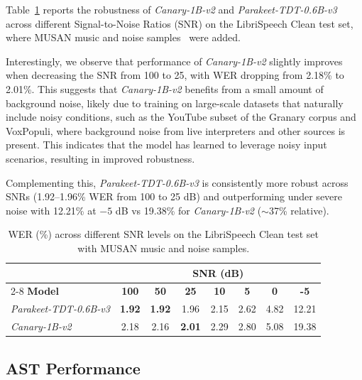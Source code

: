 Table~\ref{tab:noise-robustness} reports the robustness of \emph{Canary-1B-v2} and \emph{Parakeet-TDT-0.6B-v3} across different Signal-to-Noise Ratios (SNR) on the LibriSpeech Clean test set\cite{librispeech}, where MUSAN music and noise samples~\cite{snyder2015musanmusicspeechnoise} were added.

Interestingly, we observe that performance of \emph{Canary-1B-v2} slightly improves when decreasing the SNR from 100 to 25, with WER dropping from 2.18\% to 2.01\%. This suggests that \emph{Canary-1B-v2} benefits from a small amount of background noise, likely due to training on large-scale datasets that naturally include noisy conditions, such as the YouTube subset of the Granary corpus and VoxPopuli, where background noise from live interpreters and other sources is present. This indicates that the model has learned to leverage noisy input scenarios, resulting in improved robustness.  

Complementing this, \emph{Parakeet-TDT-0.6B-v3} is consistently more robust across SNRs (1.92–1.96\% WER from 100 to 25 dB) and outperforming under severe noise with 12.21\% at \(-5\) dB vs 19.38\% for \emph{Canary-1B-v2} (\(\sim\)37\% relative).


\begin{table}[ht]
\centering
\begin{tabular}{lccccccc}
\toprule
\ & \multicolumn{7}{c}{\textbf{SNR (dB)}} \\
\cmidrule(lr){2-8}
\textbf{Model} & \textbf{100} & \textbf{50} & \textbf{25} & \textbf{10} & \textbf{5} & \textbf{0} & \textbf{-5} \\
\midrule
\emph{Parakeet-TDT-0.6B-v3} & \textbf{1.92} & \textbf{1.92} & 1.96 & 2.15 & 2.62 & 4.82 & 12.21 \\
\midrule
\emph{Canary-1B-v2} & 2.18 & 2.16 & \textbf{2.01} & 2.29 & 2.80 & 5.08 & 19.38 \\
\bottomrule
\end{tabular}

\vspace{10pt}

\caption{WER (\%) across different SNR levels on the LibriSpeech Clean test set with MUSAN music and noise samples.}
\label{tab:noise-robustness}
\end{table}






\subsection{AST Performance}

